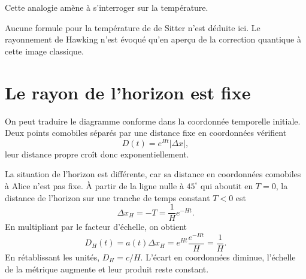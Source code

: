 Cette analogie amène à s’interroger sur la température.

\begin{classroomqa}
\end{classroomqa}

Aucune formule pour la température de de Sitter n’est déduite ici. Le rayonnement de Hawking n’est évoqué qu’en aperçu de la correction quantique à cette image classique.

\section{Le rayon de l’horizon est fixe}

On peut traduire le diagramme conforme dans la coordonnée temporelle initiale. Deux points comobiles séparés par une distance fixe en coordonnées vérifient
\begin{equation}
D(t)=e^{Ht}\lvert\Delta x\rvert,
\end{equation}
leur distance propre croît donc exponentiellement.

\begin{classroomqa}
\end{classroomqa}

La situation de l’horizon est différente, car sa distance en coordonnées comobiles à Alice n’est pas fixe. À partir de la ligne nulle à \(45^\circ\) qui aboutit en \(T=0\), la distance de l’horizon sur une tranche de temps constant \(T<0\) est
\begin{equation}
\Delta x_H=-T=\frac{1}{H}e^{-Ht}.
\label{eq:l08-coordinate-horizon}
\end{equation}
En multipliant par le facteur d’échelle, on obtient
\begin{equation}
D_H(t)=a(t)\Delta x_H
=e^{Ht}\frac{e^{-Ht}}{H}
=\frac{1}{H}.
\label{eq:l08-fixed-horizon}
\end{equation}
En rétablissant les unités, \(D_H=c/H\). L’écart en coordonnées diminue, l’échelle de la métrique augmente et leur produit reste constant.

